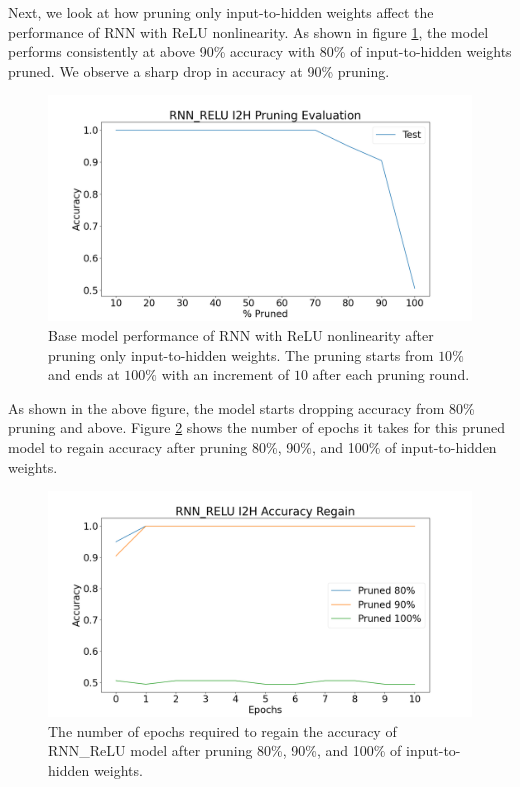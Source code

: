 Next, we look at how pruning only input-to-hidden weights affect the performance of RNN with ReLU nonlinearity. As shown in figure \ref{fig:rnn_relu_i2h_prune}, the model performs consistently at above 90\% accuracy with 80\% of input-to-hidden weights pruned. We observe a sharp drop in accuracy at 90\% pruning.

\begin{figure}[H]
	\centering
	\includegraphics[width=0.8\linewidth]{images/results/pruning_i2h/rnn_relu_i2h_pruning_evaluation.png}
	\caption[RNN\_ReLU base model performance after pruning i2h weights]%
	{Base model performance of RNN with ReLU nonlinearity after pruning only input-to-hidden weights. The pruning starts from $10\%$ and ends at $100\%$ with an increment of $10$ after each pruning round.}
	\label{fig:rnn_relu_i2h_prune}
\end{figure}

As shown in the above figure, the model starts dropping accuracy from 80\% pruning and above. Figure \ref{fig:rnn_relu_i2h_prune_regain} shows the number of epochs it takes for this pruned model to regain accuracy after pruning 80\%, 90\%, and 100\% of input-to-hidden weights.

\begin{figure}[h]
	\centering
	\includegraphics[width=0.8\linewidth]{images/results/pruning_i2h/rnn_relu_i2h_accuracy_regain.png}
	\caption[RNN\_ReLU base model performance regain after pruning i2h weights]%
	{The number of epochs required to regain the accuracy of RNN\_ReLU model after pruning 80\%, 90\%, and 100\% of input-to-hidden weights.}
	\label{fig:rnn_relu_i2h_prune_regain}
\end{figure}

